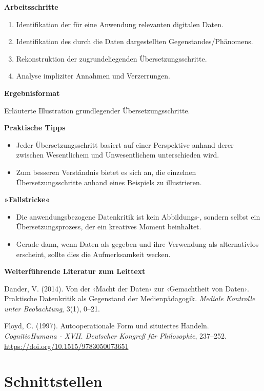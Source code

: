 \documentclass[
  a4paper,
]{book}
\providecommand{\tightlist}{%
  \setlength{\itemsep}{0pt}\setlength{\parskip}{0pt}}
\begin{document}
\textbf{Arbeitsschritte}

\begin{enumerate}
\def\labelenumi{\arabic{enumi}.}
\tightlist
\item
  Identifikation der für eine Anwendung relevanten digitalen Daten.
\item
  Identifikation des durch die Daten dargestellten Gegenstandes/Phänomens.
\item
  Rekonstruktion der zugrundeliegenden Übersetzungsschritte.
\item
  Analyse impliziter Annahmen und Verzerrungen.
\end{enumerate}

\textbf{Ergebnisformat}

Erläuterte Illustration grundlegender Übersetzungsschritte.

\textbf{Praktische Tipps}

\begin{itemize}
\tightlist
\item
  Jeder Übersetzungsschritt basiert auf einer Perspektive anhand derer zwischen Wesentlichem und Unwesentlichem unterschieden wird.
\item
  Zum besseren Verständnis bietet es sich an, die einzelnen Übersetzungsschritte anhand eines Beispiels zu illustrieren.
\end{itemize}

\textbf{»Fallstricke«}

\begin{itemize}
\tightlist
\item
  Die anwendungsbezogene Datenkritik ist kein Abbildungs-, sondern selbst ein Übersetzungsprozess, der ein kreatives Moment beinhaltet.
\item
  Gerade dann, wenn Daten als gegeben und ihre Verwendung als alternativlos erscheint, sollte dies die Aufmerksamkeit wecken.
\end{itemize}

\textbf{Weiterführende Literatur zum Leittext}

Dander, V. (2014). Von der ‹Macht der Daten› zur ‹Gemachtheit von Daten›. Praktische Datenkritik als Gegenstand der Medienpädagogik. \emph{Mediale Kontrolle unter Beobachtung}, 3(1), 0--21.

Floyd, C. (1997). Autooperationale Form und situiertes Handeln. \emph{CognitioHumana - XVII. Deutscher Kongreß für Philosophie}, 237--252. \url{https://doi.org/10.1515/9783050073651}

\chapter{Schnittstellen}\label{schnittstellen}
\end{document}

